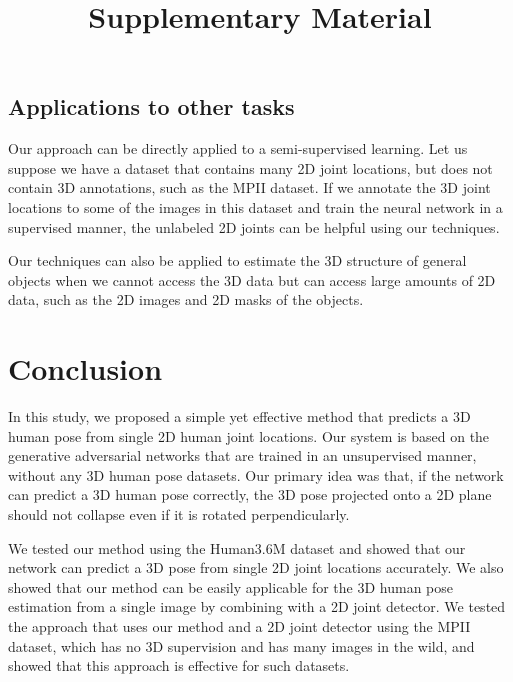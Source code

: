 \documentclass[runningheads]{llncs}
\begin{document}
\subsection{Applications to other tasks}
Our approach can be directly applied to a semi-supervised learning.
Let us suppose we have a dataset that contains many 2D joint locations, but does not contain 3D annotations, such as the MPII dataset.
If we annotate the 3D joint locations to some of the images in this dataset and train the neural network in a supervised manner, the unlabeled 2D joints can be helpful using our techniques.

Our techniques can also be applied to estimate the 3D structure of general objects when we cannot access the 3D data but can access large amounts of 2D data, such as the 2D images and 2D masks of the objects.

\section{Conclusion}
In this study, we proposed a simple yet effective method that predicts a 3D human pose from single 2D human joint locations.
Our system is based on the generative adversarial networks that are trained in an unsupervised manner, without any 3D human pose datasets.
Our primary idea was that, if the network can predict a 3D human pose correctly, the 3D pose projected onto a 2D plane should not collapse even if it is rotated perpendicularly.

We tested our method using the Human3.6M dataset and showed that our network can predict a 3D pose from single 2D joint locations accurately.
We also showed that our method can be easily applicable for the 3D human pose estimation from a single image by combining with a 2D joint detector.
We tested the approach that uses our method and a 2D joint detector using the MPII dataset, which has no 3D supervision and has many images in the wild, and showed that this approach is effective for such datasets.





\title{Supplementary Material} %



\author{\empty}
\institute{\empty}


\maketitle
\end{document}
